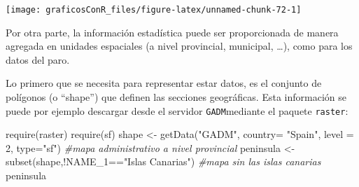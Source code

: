 \documentclass[
]{article}
\newenvironment{Shaded}{\begin{snugshade}}{\end{snugshade}}
\newcommand{\AttributeTok}[1]{\textcolor[rgb]{0.77,0.63,0.00}{#1}}
\newcommand{\CommentTok}[1]{\textcolor[rgb]{0.56,0.35,0.01}{\textit{#1}}}
\newcommand{\DecValTok}[1]{\textcolor[rgb]{0.00,0.00,0.81}{#1}}
\newcommand{\FunctionTok}[1]{\textcolor[rgb]{0.00,0.00,0.00}{#1}}
\newcommand{\NormalTok}[1]{#1}
\newcommand{\OtherTok}[1]{\textcolor[rgb]{0.56,0.35,0.01}{#1}}
\newcommand{\SpecialCharTok}[1]{\textcolor[rgb]{0.00,0.00,0.00}{#1}}
\newcommand{\StringTok}[1]{\textcolor[rgb]{0.31,0.60,0.02}{#1}}
\numberwithin{ejcnt}{section}
\begin{document}
\begin{center}\texttt{[image: graficosConR\_files/figure-latex/unnamed-chunk-72-1]} \end{center}

Por otra parte, la información estadística puede ser proporcionada de manera agregada en unidades espaciales (a nivel provincial, municipal, \ldots), como para los datos del paro.

Lo primero que se necesita para representar estar datos, es el conjunto de polígonos (o ``shape'') que definen las secciones geográficas. Esta información se puede por ejemplo descargar desde el servidor \texttt{GADM}mediante el paquete \texttt{raster}:

\begin{Shaded}
\begin{Highlighting}[]
\FunctionTok{require}\NormalTok{(raster)  }
\FunctionTok{require}\NormalTok{(sf)}
\NormalTok{shape }\OtherTok{\textless{}{-}} \FunctionTok{getData}\NormalTok{(}\StringTok{"GADM"}\NormalTok{, }\AttributeTok{country=} \StringTok{"Spain"}\NormalTok{, }\AttributeTok{level =} \DecValTok{2}\NormalTok{, }\AttributeTok{type=}\StringTok{"sf"}\NormalTok{) }\CommentTok{\#mapa administrativo a nivel provincial}
\NormalTok{peninsula }\OtherTok{\textless{}{-}} \FunctionTok{subset}\NormalTok{(shape,}\SpecialCharTok{!}\NormalTok{NAME\_1}\SpecialCharTok{==}\StringTok{"Islas Canarias"}\NormalTok{) }\CommentTok{\#mapa sin las islas canarias}
\NormalTok{peninsula }
\end{Highlighting}
\end{Shaded}
\end{document}
